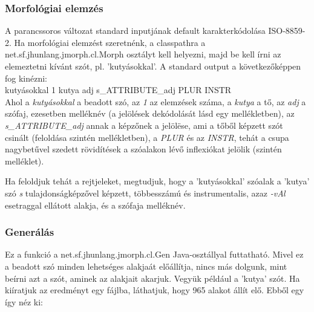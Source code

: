 \documentclass{article}
\begin{document}
\subsubsection{Morfol\'ogiai elemz\'es}

A parancssoros v\'altozat standard inputj\'anak default karakterk\'odol\'asa ISO-8859-2. Ha morfol\'ogiai elemz\'est szeretn\'enk, a classpathra a net.sf.jhunlang.jmorph.cl.Morph oszt\'alyt kell helyezni, majd be kell \'{i}rni az elemeztetni k\'{i}v\'ant sz\'ot, pl. 'kuty\'asokkal'. A standard output a k\"ovetkez\H{o}k\'eppen fog kin\'ezni: \\

kuty\'asokkal    1     kutya   adj s\_ATTRIBUTE\_adj  PLUR  INSTR  \\

Ahol
a \textit{kuty\'asokkal} a beadott sz\'o,
az \textit{1} az elemz\'esek sz\'ama,
a \textit{kutya} a t\H{o},
az \textit{adj} a sz\'ofaj, ezesetben mell\'ekn\'ev (a jel\"ol\'esek dek\'odol\'as\'at l\'asd egy mell\'ekletben),
az \textit{s\_ATTRIBUTE\_adj} annak a k\'epz\H{o}nek a jel\"ol\"ese, ami a t\H{o}b\H{o}l k\'epzett sz\'ot csin\'alt (felold\'asa szint\'en mell\'ekletben),
a \textit{PLUR} \'es az \textit{INSTR}, teh\'at a csupa nagybet\H{u}vel szedett r\"ovid\'{i}t\'esek a sz\'oalakon l\'ev\H{o} inflexi\'okat jel\"olik (szint\'en mell\'eklet).

Ha feloldjuk teh\'at a rejtjeleket, megtudjuk, hogy a 'kuty\'asokkal' sz\'oalak a 'kutya' sz\'o \textit{s} tulajdons\'agk\'epz\H{o}vel k\'epzett, t\"obbessz\'am\'u \'es instrumentalis, azaz \textit{-vAl} esetraggal ell\'atott alakja, \'es a sz\'ofaja mell\'ekn\'ev. \par

\subsubsection{Gener\'al\'as}

Ez a funkci\'o a net.sf.jhunlang.jmorph.cl.Gen Java-oszt\'allyal futtathat\'o. Mivel ez a beadott sz\'o minden lehets\'eges alakja\'at el\H{o}\'all\'{i}tja, nincs m\'as dolgunk, mint be\'{i}rni azt a sz\'ot, aminek az alakjait akarjuk. Vegy\"uk p\'eld\'aul a 'kutya' sz\'ot. Ha ki\'{i}ratjuk az eredm\'enyt egy f\'ajlba, l\'athatjuk, hogy 965 alakot \'all\'{i}t el\H{o}. %
Ebb\H{o}l egy \'{i}gy n\'ez ki: \\ 
\end{document}
